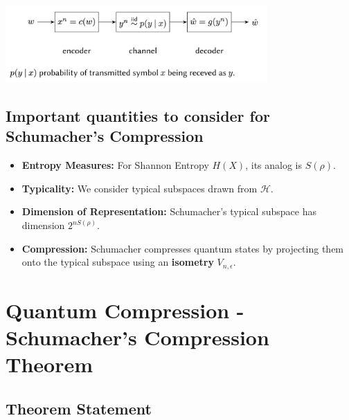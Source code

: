 \begin{center}
    \includegraphics[width=0.75\textwidth]{figures/shannon_pic.png}
\end{center}

\subsection{Important quantities to consider for Schumacher's Compression}

\begin{itemize}
\item \textbf{Entropy Measures:}
For Shannon Entropy \(H(X)\), its analog is \(S(\rho)\).

\item \textbf{Typicality:}
We consider typical subspaces drawn from \(\mathcal{H}\).

\item \textbf{Dimension of Representation:}
Schumacher's typical subspace has dimension \(2^{nS(\rho)}\).

\item \textbf{Compression:}
Schumacher compresses quantum states by projecting them onto the typical subspace using an \textbf{isometry} \(V_{n,\epsilon}\).

\end{itemize}

\section{Quantum Compression - Schumacher's Compression Theorem}

\subsection{Theorem Statement}

